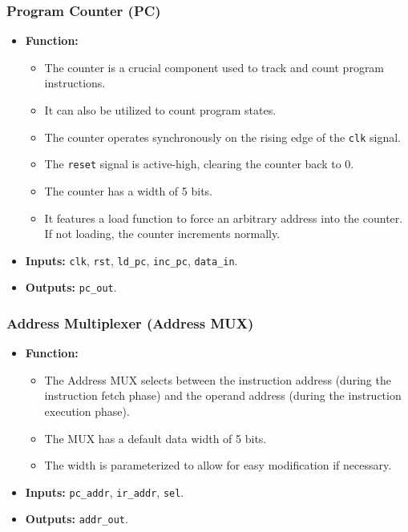 \subsubsection*{Program Counter (PC)}
\begin{itemize}
	\item \textbf{Function:}
	      \begin{itemize}
		      \item The counter is a crucial component used to track and count program instructions.
		      \item It can also be utilized to count program states.
		      \item The counter operates synchronously on the rising edge of the \texttt{clk} signal.
		      \item The \texttt{reset} signal is active-high, clearing the counter back to 0.
		      \item The counter has a width of 5 bits.
		      \item It features a load function to force an arbitrary address into the counter. If not loading, the counter increments normally.
	      \end{itemize}
	\item \textbf{Inputs:} \texttt{clk}, \texttt{rst}, \texttt{ld\_pc}, \texttt{inc\_pc}, \texttt{data\_in}.
	\item \textbf{Outputs:} \texttt{pc\_out}.
\end{itemize}

\subsubsection*{Address Multiplexer (Address MUX)}
\begin{itemize}
	\item \textbf{Function:}
	      \begin{itemize}
		      \item The Address MUX selects between the instruction address (during the instruction fetch phase) and the operand address (during the instruction execution phase).
		      \item The MUX has a default data width of 5 bits.
		      \item The width is parameterized to allow for easy modification if necessary.
	      \end{itemize}
	\item \textbf{Inputs:} \texttt{pc\_addr}, \texttt{ir\_addr}, \texttt{sel}.
	\item \textbf{Outputs:} \texttt{addr\_out}.
\end{itemize}

